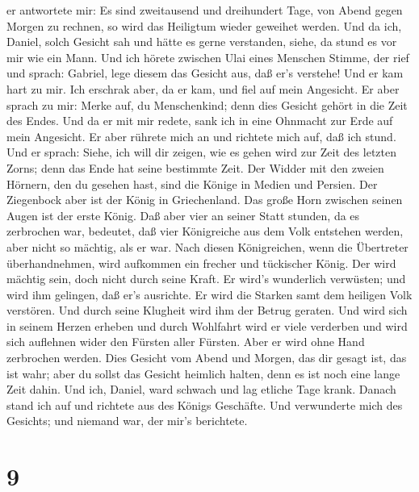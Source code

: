 er antwortete mir: Es sind zweitausend und dreihundert Tage, von Abend
gegen Morgen zu rechnen, so wird das Heiligtum wieder geweihet werden.
 Und da ich, Daniel, solch Gesicht sah und hätte es gerne
verstanden, siehe, da stund es vor mir wie ein Mann.  Und
ich hörete zwischen Ulai eines Menschen Stimme, der rief und sprach:
Gabriel, lege diesem das Gesicht aus, daß er's verstehe! 
Und er kam hart zu mir. Ich erschrak aber, da er kam, und fiel auf mein
Angesicht. Er aber sprach zu mir: Merke auf, du Menschenkind; denn dies
Gesicht gehört in die Zeit des Endes.  Und da er mit mir
redete, sank ich in eine Ohnmacht zur Erde auf mein Angesicht. Er aber
rührete mich an und richtete mich auf, daß ich stund.  Und
er sprach: Siehe, ich will dir zeigen, wie es gehen wird zur Zeit des
letzten Zorns; denn das Ende hat seine bestimmte Zeit.  Der
Widder mit den zweien Hörnern, den du gesehen hast, sind die Könige in
Medien und Persien.  Der Ziegenbock aber ist der König in
Griechenland. Das große Horn zwischen seinen Augen ist der erste König.
 Daß aber vier an seiner Statt stunden, da es zerbrochen
war, bedeutet, daß vier Königreiche aus dem Volk entstehen werden, aber
nicht so mächtig, als er war.  Nach diesen Königreichen,
wenn die Übertreter überhandnehmen, wird aufkommen ein frecher und
tückischer König.  Der wird mächtig sein, doch nicht durch
seine Kraft. Er wird's wunderlich verwüsten; und wird ihm gelingen, daß
er's ausrichte. Er wird die Starken samt dem heiligen Volk verstören.
 Und durch seine Klugheit wird ihm der Betrug geraten. Und
wird sich in seinem Herzen erheben und durch Wohlfahrt wird er viele
verderben und wird sich auflehnen wider den Fürsten aller Fürsten. Aber
er wird ohne Hand zerbrochen werden.  Dies Gesicht vom
Abend und Morgen, das dir gesagt ist, das ist wahr; aber du sollst das
Gesicht heimlich halten, denn es ist noch eine lange Zeit dahin.
 Und ich, Daniel, ward schwach und lag etliche Tage krank.
Danach stand ich auf und richtete aus des Königs Geschäfte. Und
verwunderte mich des Gesichts; und niemand war, der mir's berichtete.

\hypertarget{section-8}{%
\section{9}\label{section-8}}

